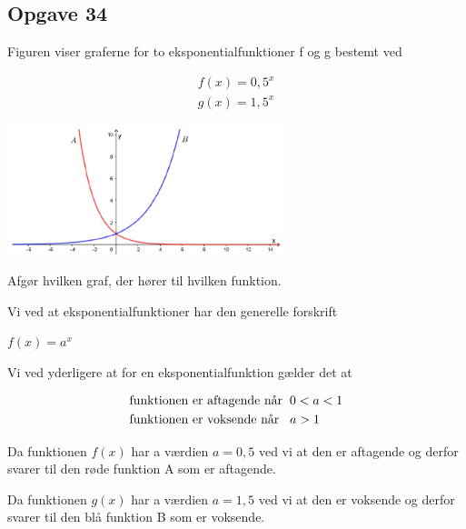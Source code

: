 \subsection{Opgave 34}

Figuren viser graferne for to eksponentialfunktioner f og g bestemt ved

\begin{align*}
    f(x) = 0,5^x \\
    g(x) = 1,5^x
\end{align*}

\includegraphics[width=8cm]{Opgave_31-40/Opgave_34/34.png}

Afgør hvilken graf, der hører til hvilken funktion.

\ans

Vi ved at eksponentialfunktioner har den generelle forskrift

$f(x) = a^x$

Vi ved yderligere at for en eksponentialfunktion gælder det at 

\begin{align*}
    &\text{funktionen er aftagende når} \hspace*{2mm} 0 < a < 1\\
    &\text{funktionen er voksende når} \hspace*{3mm} a > 1
\end{align*}

Da funktionen $f(x)$ har a værdien $a = 0,5$ ved vi at den er aftagende og derfor svarer til den røde funktion A som er aftagende.

Da funktionen $g(x)$ har a værdien $a = 1,5$ ved vi at den er voksende og derfor svarer til den blå funktion B som er voksende.
